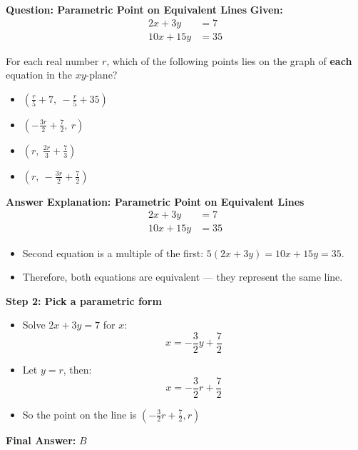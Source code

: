 \documentclass{beamer}
\begin{document}
\begin{frame}{\textbf{Question: Parametric Point on Equivalent Lines}}
    \textbf{Given:}
    \[
    \begin{aligned}
        2x + 3y &= 7 \\
        10x + 15y &= 35
    \end{aligned}
    \]

    For each real number $r$, which of the following points lies on the graph of \textbf{each} equation in the $xy$-plane?

    \begin{itemize}
        \item[(A)] $\left( \frac{r}{5} + 7,\ -\frac{r}{5} + 35 \right)$
        \item[(B)] $\left( -\frac{3r}{2} + \frac{7}{2},\ r \right)$
        \item[(C)] $\left( r,\ \frac{2r}{3} + \frac{7}{3} \right)$
        \item[(D)] $\left( r,\ -\frac{3r}{2} + \frac{7}{2} \right)$
    \end{itemize}
\end{frame}

\begin{frame}{\textbf{Answer Explanation: Parametric Point on Equivalent Lines}}
    \[
    \begin{aligned}
        2x + 3y &= 7 \\
        10x + 15y &= 35
    \end{aligned}
    \]

    \begin{itemize}
        \item Second equation is a multiple of the first: $5(2x + 3y) = 10x + 15y = 35$.
        \item Therefore, both equations are equivalent — they represent the same line.
    \end{itemize}

    \textbf{Step 2: Pick a parametric form}
    \begin{itemize}
        \item Solve $2x + 3y = 7$ for $x$:
        \[
        x = -\frac{3}{2}y + \frac{7}{2}
        \]
        \item Let $y = r$, then:
        \[
        x = -\frac{3}{2}r + \frac{7}{2}
        \]
        \item So the point on the line is $\left(  -\frac{3}{2}r + \frac{7}{2},r \right)$
    \end{itemize}

    \textbf{Final Answer:} \( \boxed{B} \)

\end{frame}
\end{document}
